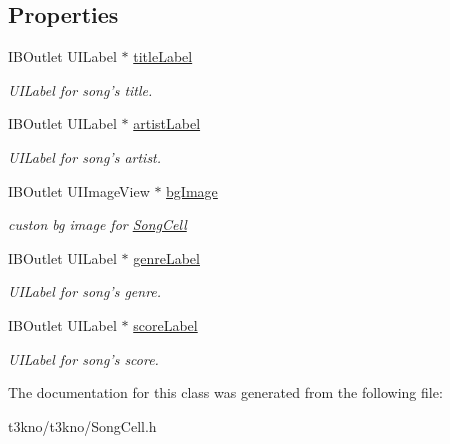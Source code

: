 \subsection*{Properties}
\begin{DoxyCompactItemize}
\item 
\hypertarget{interface_song_cell_a8e0a134662f4cb7ccaefa05eb89a8564}{I\-B\-Outlet U\-I\-Label $\ast$ \hyperlink{interface_song_cell_a8e0a134662f4cb7ccaefa05eb89a8564}{title\-Label}}\label{interface_song_cell_a8e0a134662f4cb7ccaefa05eb89a8564}

\begin{DoxyCompactList}\small\item\em U\-I\-Label for song's title. \end{DoxyCompactList}\item 
\hypertarget{interface_song_cell_a5f4d80b3acc9a649d879e52f843e6fef}{I\-B\-Outlet U\-I\-Label $\ast$ \hyperlink{interface_song_cell_a5f4d80b3acc9a649d879e52f843e6fef}{artist\-Label}}\label{interface_song_cell_a5f4d80b3acc9a649d879e52f843e6fef}

\begin{DoxyCompactList}\small\item\em U\-I\-Label for song's artist. \end{DoxyCompactList}\item 
\hypertarget{interface_song_cell_aba70af84a450137df72c13c45b117f0c}{I\-B\-Outlet U\-I\-Image\-View $\ast$ \hyperlink{interface_song_cell_aba70af84a450137df72c13c45b117f0c}{bg\-Image}}\label{interface_song_cell_aba70af84a450137df72c13c45b117f0c}

\begin{DoxyCompactList}\small\item\em custon bg image for \hyperlink{interface_song_cell}{Song\-Cell} \end{DoxyCompactList}\item 
\hypertarget{interface_song_cell_a7cc4fe49be0d4422608c3d8c9e956594}{I\-B\-Outlet U\-I\-Label $\ast$ \hyperlink{interface_song_cell_a7cc4fe49be0d4422608c3d8c9e956594}{genre\-Label}}\label{interface_song_cell_a7cc4fe49be0d4422608c3d8c9e956594}

\begin{DoxyCompactList}\small\item\em U\-I\-Label for song's genre. \end{DoxyCompactList}\item 
\hypertarget{interface_song_cell_aecc623a9c8837b2511980cb2dd331cf4}{I\-B\-Outlet U\-I\-Label $\ast$ \hyperlink{interface_song_cell_aecc623a9c8837b2511980cb2dd331cf4}{score\-Label}}\label{interface_song_cell_aecc623a9c8837b2511980cb2dd331cf4}

\begin{DoxyCompactList}\small\item\em U\-I\-Label for song's score. \end{DoxyCompactList}\end{DoxyCompactItemize}


The documentation for this class was generated from the following file\-:\begin{DoxyCompactItemize}
\item 
t3kno/t3kno/Song\-Cell.\-h\end{DoxyCompactItemize}
